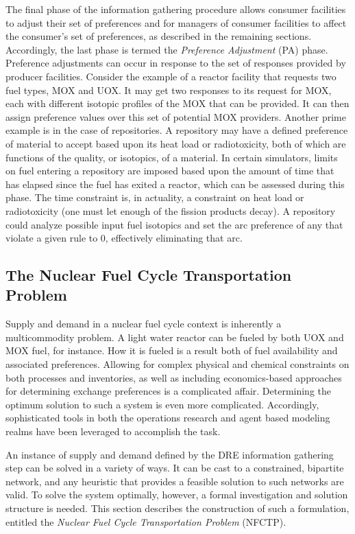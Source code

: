 The final phase of the information gathering procedure allows consumer
facilities to adjust their set of preferences and for managers of consumer
facilities to affect the consumer's set of preferences, as described in the
remaining sections. Accordingly, the last phase is termed the \textit{Preference
 Adjustment} (PA) phase. Preference adjustments can occur in response to the
set of responses provided by producer facilities. Consider the example of a
reactor facility that requests two fuel types, MOX and UOX. It may get two
responses to its request for MOX, each with different isotopic profiles of the
MOX that can be provided. It can then assign preference values over this set of
potential MOX providers. Another prime example is in the case of repositories. A
repository may have a defined preference of material to accept based upon its
heat load or radiotoxicity, both of which are functions of the quality, or
isotopics, of a material. In certain simulators, limits on fuel entering a
repository are imposed based upon the amount of time that has elapsed since the
fuel has exited a reactor, which can be assessed during this phase. The time
constraint is, in actuality, a constraint on heat load or radiotoxicity (one
must let enough of the fission products decay). A repository could analyze
possible input fuel isotopics and set the arc preference of any that violate a
given rule to 0, effectively eliminating that arc.

\subsection{The Nuclear Fuel Cycle Transportation Problem}\label{abm:dre:fctp}

Supply and demand in a nuclear fuel cycle context is inherently a multicommodity
problem. A light water reactor can be fueled by both UOX and MOX fuel, for
instance. How it is fueled is a result both of fuel availability and associated
preferences. Allowing for complex physical and chemical constraints on both
processes and inventories, as well as including economics-based approaches for
determining exchange preferences is a complicated affair. Determining the
optimum solution to such a system is even more complicated. Accordingly,
sophisticated tools in both the operations research and agent based modeling
realms have been leveraged to accomplish the task.

An instance of supply and demand defined by the DRE information gathering step
can be solved in a variety of ways. It can be cast to a constrained, bipartite
network, and any heuristic that provides a feasible solution to such networks
are valid. To solve the system optimally, however, a formal investigation and
solution structure is needed. This section describes the construction of such a
formulation, entitled the \textit{Nuclear Fuel Cycle Transportation Problem}
(NFCTP).

